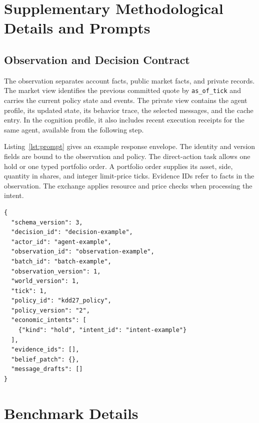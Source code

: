 \appendix
\section{Supplementary Methodological Details and Prompts}
\label{sec:appendix}

\subsection{Observation and Decision Contract}
\label{app:prompt}

The observation separates account facts, public market facts, and private records. The market view identifies the previous committed quote by \texttt{as\_of\_tick} and carries the current policy state and events. The private view contains the agent profile, its updated state, its behavior trace, the selected messages, and the cache entry. In the cognition profile, it also includes recent execution receipts for the same agent, available from the following step.

Listing~\ref{lst:prompt} gives an example response envelope. The identity and version fields are bound to the observation and policy. The direct-action task allows one hold or one typed portfolio order. A portfolio order supplies its asset, side, quantity in shares, and integer limit-price ticks. Evidence IDs refer to facts in the observation. The exchange applies resource and price checks when processing the intent.

\noindent\begin{minipage}{\columnwidth}
\begin{lstlisting}[caption={Example of a typed hold response.}, label={lst:prompt}, basicstyle=\ttfamily\scriptsize, breaklines=true, frame=single, aboveskip=3pt, belowskip=3pt]
{
  "schema_version": 3,
  "decision_id": "decision-example",
  "actor_id": "agent-example",
  "observation_id": "observation-example",
  "batch_id": "batch-example",
  "observation_version": 1,
  "world_version": 1,
  "tick": 1,
  "policy_id": "kdd27_policy",
  "policy_version": "2",
  "economic_intents": [
    {"kind": "hold", "intent_id": "intent-example"}
  ],
  "evidence_ids": [],
  "belief_patch": {},
  "message_drafts": []
}
\end{lstlisting}
\end{minipage}

\section{Benchmark Details}
\label{app:benchmark_details}

